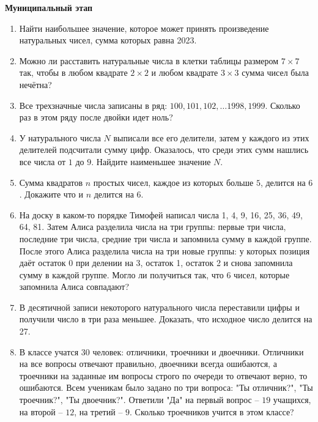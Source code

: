 \documentclass{article}
\begin{document}
\large
	
\begin{center}
	\textbf{Муниципальный этап}
\end{center}


\begin{enumerate}[label*=\protect\fbox{\arabic{enumi}}]
	
\item Найти наибольшее значение, которое может принять произведение натуральных чисел, сумма которых равна 2023.

\item Можно ли расставить натуральные числа в клетки таблицы размером $7 \times 7$ так, чтобы в любом квадрате $2 \times 2$ и любом квадрате $3 \times 3$ сумма чисел была нечётна?

\item Все трехзначные числа записаны в ряд: $100, 101, 102, \dotso 1998, 1999$. Сколько раз в этом ряду после двойки идет ноль?

\item У натурального числа $N$ выписали все его делители, затем у каждого из этих делителей подсчитали сумму цифр. Оказалось, что среди этих сумм нашлись все числа от $1$ до $9$. Найдите наименьшее значение $N$.

\item Сумма квадратов $n$ простых чисел, каждое из которых больше $5$, делится на $6$. Докажите что и 
$n$ делится на 6.

\item На доску в каком-то порядке Тимофей написал числа 1, 4, 9, 16, 25, 36, 49, 64, 81. Затем Алиса разделила числа на три группы: первые три числа, последние три числа, средние три числа и запомнила сумму в каждой группе. После этого Алиса разделила числа на три новые группы: у которых позиция даёт остаток 0 при делении на 3, остаток 1, остаток 2 и снова запомнила сумму в каждой группе. Могло ли получиться так, что 6 чисел, которые запомнила Алиса совпадают?

\item В десятичной записи некоторого натурального числа переставили цифры и получили число в три раза меньшее.
Доказать, что исходное число делится на 27.

\item В классе учатся 30 человек: отличники, троечники и двоечники. Отличники на все вопросы отвечают правильно, двоечники всегда ошибаются, а троечники на заданные им вопросы строго по очереди то отвечают верно, то ошибаются. Всем ученикам было задано по три вопроса: "Ты отличник?", "Ты троечник?",
"Ты двоечник?". Ответили "Да" на первый вопрос – $19$ учащихся, на второй – $12$, на третий – $9$. Сколько троечников учится в этом классе?


\end{enumerate}
\end{document}
